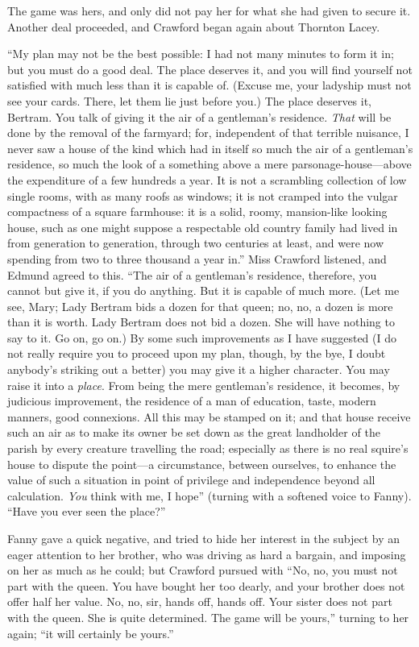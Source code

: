 The game was hers, and only did not pay her for what
she had given to secure it.  Another deal proceeded,
and Crawford began again about Thornton Lacey.

``My plan may not be the best possible:  I had not many
minutes to form it in; but you must do a good deal.
The place deserves it, and you will find yourself not
satisfied with much less than it is capable of.  (Excuse me,
your ladyship must not see your cards.  There, let them
lie just before you.) The place deserves it, Bertram.
You talk of giving it the air of a gentleman's residence.
\emph{That} will be done by the removal of the farmyard;
for, independent of that terrible nuisance, I never saw
a house of the kind which had in itself so much the air
of a gentleman's residence, so much the look of a something
above a mere parsonage-house---above the expenditure of a few
hundreds a year.  It is not a scrambling collection of low
single rooms, with as many roofs as windows; it is not
cramped into the vulgar compactness of a square farmhouse:
it is a solid, roomy, mansion-like looking house, such as one
might suppose a respectable old country family had lived
in from generation to generation, through two centuries
at least, and were now spending from two to three thousand
a year in.''  Miss Crawford listened, and Edmund agreed
to this.  ``The air of a gentleman's residence, therefore,
you cannot but give it, if you do anything.  But it is
capable of much more.  (Let me see, Mary; Lady Bertram
bids a dozen for that queen; no, no, a dozen is more
than it is worth.  Lady Bertram does not bid a dozen.
She will have nothing to say to it.  Go on, go on.)
By some such improvements as I have suggested (I do not really
require you to proceed upon my plan, though, by the bye,
I doubt anybody's striking out a better) you may give it
a higher character.  You may raise it into a \emph{place}.
From being the mere gentleman's residence, it becomes,
by judicious improvement, the residence of a man
of education, taste, modern manners, good connexions.
All this may be stamped on it; and that house receive
such an air as to make its owner be set down as the great
landholder of the parish by every creature travelling
the road; especially as there is no real squire's house
to dispute the point---a circumstance, between ourselves,
to enhance the value of such a situation in point
of privilege and independence beyond all calculation.
\emph{You} think with me, I hope'' (turning with a softened
voice to Fanny). ``Have you ever seen the place?''

Fanny gave a quick negative, and tried to hide her interest
in the subject by an eager attention to her brother,
who was driving as hard a bargain, and imposing on her
as much as he could; but Crawford pursued with ``No, no,
you must not part with the queen.  You have bought
her too dearly, and your brother does not offer half
her value.  No, no, sir, hands off, hands off.  Your sister
does not part with the queen.  She is quite determined.
The game will be yours,'' turning to her again; ``it will
certainly be yours.''

